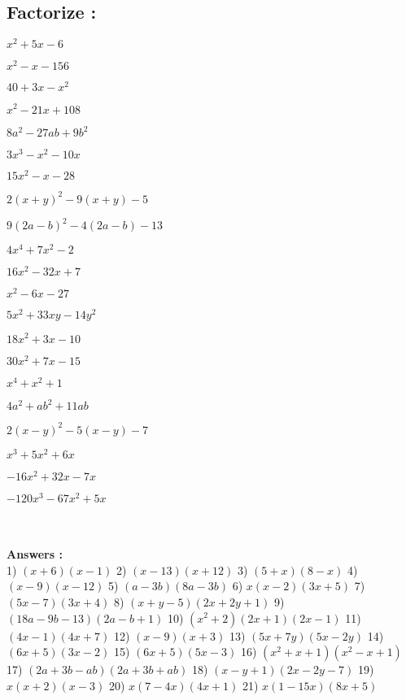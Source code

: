 \documentclass{article}
\begin{document}
\subsection{Factorize :}
\begin{enumerate*}
	\item $x^2+5x-6$ \item $x^2-x-156$ \item $40+3x-x^2$ \item $x^2-21x+108$ \item $8a^2-27ab+9b^2$ \item $3x^3-x^2-10x$ \item $15x^2-x-28$ \item $2(x+y)^2-9(x+y)-5$ \item $9(2a-b)^2-4(2a-b)-13$ \item $4x^4+7x^2-2$ \item $16x^2-32x+7$ \item $x^2-6x-27$ \item $5x^2+33xy-14y^2$ \item $18x^2+3x-10$ \item $30x^2+7x-15$ \item $x^4+x^2+1$ \item $4a^2+ab^2+11ab$ \item $2(x-y)^2-5(x-y)-7$ \item $x^3+5x^2+6x$ \item $-16x^2+32x-7x$ \item $-120x^3-67x^2+5x$
\end{enumerate*}\\\\
{\small \textbf{Answers :}}\\
{\footnotesize 1) $(x+6)(x-1)$} {\footnotesize 2) $(x-13)(x+12)$} {\footnotesize 3) $(5+x)(8-x)$} {\footnotesize 4) $(x-9)(x-12)$} {\footnotesize 5) $(a-3b)(8a-3b)$} {\footnotesize 6) $x(x-2)(3x+5)$} {\footnotesize 7) $(5x-7)(3x+4)$} {\footnotesize 8) $(x+y-5)(2x+2y+1)$} {\footnotesize 9) $(18a-9b-13)(2a-b+1)$} {\footnotesize 10) $\left(x^{2}+2\right)(2x+1)(2x-1)$} {\footnotesize 11) $(4x-1)(4x+7)$} {\footnotesize 12) $(x-9)(x+3)$} {\footnotesize 13) $(5x+7y)(5x-2y)$} {\footnotesize 14) $(6x+5)(3x-2)$} {\footnotesize 15) $(6x+5)(5x-3)$} {\footnotesize 16) $\left(x^{2}+x+1\right)\left(x^{2}-x+1\right)$} {\footnotesize 17) $(2a+3b-ab)(2a+3b+ab)$} {\footnotesize 18) $(x-y+1)(2x-2y-7)$} {\footnotesize 19) $x(x+2)(x-3)$} {\footnotesize 20) $x(7-4x)(4x+1)$} {\footnotesize 21) $x(1-15x)(8x+5)$}
\end{document}
